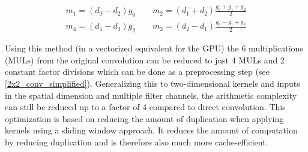 \begin{equation} \label{2x2_conv_simplified}
	\begin{array}{c}
		m_1 = (d_0 - d_2) g_0 \qquad m_2 = (d_1 + d_2) \frac{g_0 + g_1 + g_2}{2} \\[6pt]
		m_4 = (d_1 - d_3) g_2 \qquad m_3 = (d_2 - d_1) \frac{g_0 - g_1 + g_2}{2}
	\end{array}
\end{equation}

Using this method (in a vectorized equivalent for the GPU) the 6 multiplications (MULs) from the original convolution can be reduced to just 4 MULs and 2 constant factor divisions which can be done as a preprocessing step (see \autoref{2x2_conv_simplified}). Generalizing this to two-dimensional kernels and inputs in the spatial dimension and multiple filter channels, the arithmetic complexity can still be reduced up to a factor of 4 compared to direct convolution. This optimization is based on reducing the amount of duplication when applying kernels using a sliding window approach. It reduces the amount of computation by reducing duplication and is therefore also much more cache-efficient. \cite{AndrewLavin.2015}